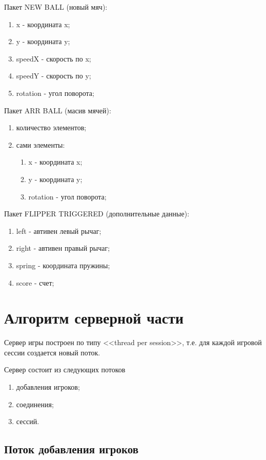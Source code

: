 Пакет NEW BALL (новый мяч):
\begin{enumerate}
\item x - координата x;
\item y - координата y;
\item speedX - скорость по x;
\item speedY - скорость по y;
\item rotation - угол поворота;
\end{enumerate}

Пакет ARR BALL (масив мячей):
\begin{enumerate}
\item количество элементов;
\item сами элементы:
  \begin{enumerate}
  \item x - координата x;
  \item y - координата y;
  \item rotation - угол поворота;
  \end{enumerate}
\end{enumerate}

Пакет FLIPPER TRIGGERED (дополнительные данные):
\begin{enumerate}
\item left - автивен левый рычаг;
\item right - автивен правый рычаг;
\item spring - координата пружины;
\item score - счет;
\end{enumerate}

\section{Алгоритм серверной части}

Сервер игры построен по типу <<thread per session>>, т.е. для каждой игровой сессии создается новый поток. 

Сервер состоит из следующих потоков
\begin{enumerate}
\item добавления игроков;
\item соединения;
\item сессий. 
\end{enumerate}

\subsection{Поток добавления игроков}

